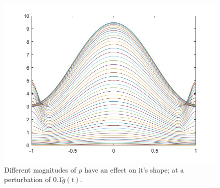 \documentclass[11pt, a4paper]{article}
\theoremstyle{definition}
\begin{document}
\begin{figure}[h]
	\includegraphics[scale=0.3]{Nlinrho3.jpg}
	\caption{Different magnitudes of $\rho$ have an effect on it's shape; at a perturbation of $0.1 \tilde g(t)$.}
	\label{Nlinrho1}
\end{figure}
\end{document}
